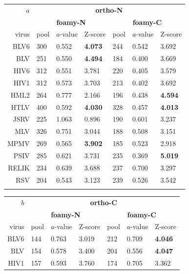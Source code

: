 \documentclass[preprint,12pt]{elsarticle}
\begin{document}
\begin{table}
\centering
\begin{tabular}{r|lll|lll|}
$a$  & \multicolumn{6}{c|}{\bf ortho-N} \\
     & \multicolumn{3}{c|}{\bf foamy-N} & \multicolumn{3}{c|}{\bf foamy-C}  \\
\hline \hline
virus  & pool & $a$-value & Z-score & pool & $a$-value & Z-score \\
\hline
BLV6   &  300  & 0.552 & {\bf 4.073} &  244  & 0.542 &      3.692  \\
BLV    &  251  & 0.550 & {\bf 4.494} &  184  & 0.400 &      3.669  \\
HIV6   &  312  & 0.551 &      3.781  &  220  & 0.405 &      3.579  \\
HIV1   &  312  & 0.573 &      3.703  &  213  & 0.402 &      3.692  \\
HML2   &  264  & 0.777 &      2.166  &  196  & 0.438 & {\bf 4.594} \\
HTLV   &  400  & 0.592 & {\bf 4.030} &  328  & 0.457 & {\bf 4.013} \\
JSRV   &  225  & 1.063 &      0.896  &  190  & 0.601 &      3.237  \\
MLV    &  326  & 0.751 &      3.044  &  188  & 0.508 &      3.151  \\
MPMV   &  269  & 0.565 & {\bf 3.902} &  185  & 0.523 &      2.918  \\
PSIV   &  285  & 0.621 &      3.731  &  235  & 0.369 & {\bf 5.019} \\
RELIK  &  234  & 0.639 &      3.688  &  237  & 0.700 &      3.297  \\
RSV    &  204  & 0.543 &      3.123  &  239  & 0.526 &      3.542  \\
\hline \hline
\vspace{10pt}
\end{tabular}
\begin{tabular}{r|lll|lll|}
$b$  & \multicolumn{6}{c|}{\bf ortho-C} \\
     & \multicolumn{3}{c|}{\bf foamy-N} & \multicolumn{3}{c|}{\bf foamy-C}  \\
\hline \hline
virus  & pool & $a$-value & Z-score & pool & $a$-value & Z-score \\
\hline
BLV6   &  144  & 0.763 &      3.019  &  212  & 0.709 & {\bf 4.046} \\
BLV    &  154  & 0.578 &      3.400  &  204  & 0.556 & {\bf 4.047} \\
HIV1   &  157  & 0.593 &      3.760  &  174  & 0.705 &      3.362  \\

\end{tabular}
\end{table}
\end{document}
